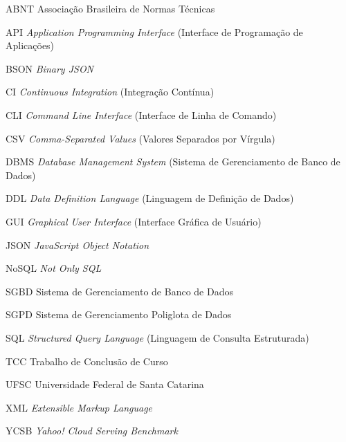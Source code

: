 \documentclass[
  12pt,
  oneside,
  a4paper,
  chapter=TITLE,
  section=TITLE,
  english,
  brazil,
]{abntex2}
\begin{document}
\begin{siglas}
  \item[ABNT] Associação Brasileira de Normas Técnicas
  \item[API] \textit{Application Programming Interface} (Interface de Programação de Aplicações)
  \item[BSON] \textit{Binary JSON}
  \item[CI] \textit{Continuous Integration} (Integração Contínua)
  \item[CLI] \textit{Command Line Interface} (Interface de Linha de Comando)
  \item[CSV] \textit{Comma-Separated Values} (Valores Separados por Vírgula)
  \item[DBMS] \textit{Database Management System} (Sistema de Gerenciamento de Banco de Dados)
  \item[DDL] \textit{Data Definition Language} (Linguagem de Definição de Dados)
  \item[GUI] \textit{Graphical User Interface} (Interface Gráfica de Usuário)
  \item[JSON] \textit{JavaScript Object Notation}
  \item[NoSQL] \textit{Not Only SQL}
  \item[SGBD] Sistema de Gerenciamento de Banco de Dados
  \item[SGPD] Sistema de Gerenciamento Poliglota de Dados
  \item[SQL] \textit{Structured Query Language} (Linguagem de Consulta Estruturada)
  \item[TCC] Trabalho de Conclusão de Curso
  \item[UFSC] Universidade Federal de Santa Catarina
  \item[XML] \textit{Extensible Markup Language}
  \item[YCSB] \textit{Yahoo! Cloud Serving Benchmark}
\end{siglas}

\tableofcontents*
\cleardoublepage

\textual









\postextual

\renewcommand{\bibname}{Referências}


\begin{apendicesenv}
\partapendices



\end{apendicesenv}

\printindex
\end{document}
